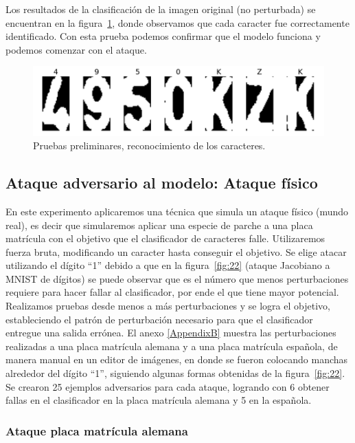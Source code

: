 Los resultados de la clasificación de la imagen original (no perturbada) se encuentran en la figura~\ref{fig:59}, donde observamos que cada caracter fue correctamente identificado. Con esta prueba podemos confirmar que el modelo funciona y podemos comenzar con el ataque.

 \begin{figure}[!h]
    \centering
    \includegraphics[scale = 1]{Figures/figura_59.PNG}
    \decoRule
    \caption[Pruebas preliminares, reconocimiento de los caracteres]{Pruebas preliminares, reconocimiento de los caracteres.}
    \label{fig:59}
\end{figure}

\subsection{Ataque adversario al modelo: Ataque físico}
En este experimento aplicaremos una técnica que simula un ataque físico (mundo real), es decir que simularemos aplicar una especie de parche a una placa matrícula con el objetivo que el clasificador de caracteres falle. Utilizaremos fuerza bruta, modificando un caracter hasta conseguir el objetivo. Se elige atacar utilizando el dígito “1” debido a que en la figura~\ref{fig:22} (ataque Jacobiano a MNIST de dígitos) se puede observar que es el número que menos perturbaciones requiere para hacer fallar al clasificador, por ende el que tiene mayor potencial.
Realizamos pruebas desde menos a más perturbaciones y se logra el objetivo, estableciendo el patrón de perturbación necesario para que el clasificador entregue una salida errónea.
El anexo \ref{AppendixB} muestra las perturbaciones realizadas a una placa matrícula alemana y a una placa matrícula española, de manera manual en un editor de imágenes, en donde se fueron colocando manchas  alrededor del dígito “1”, siguiendo algunas formas obtenidas de la figura~\ref{fig:22}. Se crearon 25 ejemplos adversarios para cada ataque, logrando con 6 obtener fallas en el clasificador en la placa matrícula alemana y 5 en la española.




\subsubsection{Ataque placa matrícula alemana}

